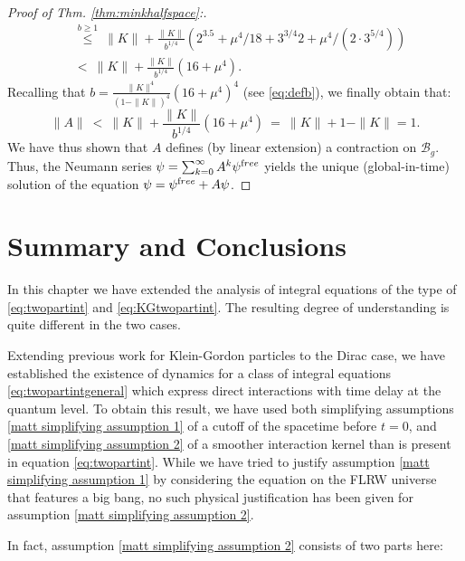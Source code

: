 \documentclass[b5paper,draft,openbib,12pt]{memoir}
\newcommand{\free}{{\textup free}}
\newcommand{\Banach}{\mathscr{B}}
\begin{document}
\begin{proof}[Proof of Thm. \ref{thm:minkhalfspace}:]
\begin{align}
&\overset{b\ge 1}{\le}~ \|K\| + \frac{\|K\|}{b^{1/4}} \left(2^{3.5}+ \mu^4/18 + 3^{3/4} 2 + \mu^4/(2 \cdot 3^{5/4})\right)\\
&<~ \|K\| + \frac{\|K\|}{b^{1/4}} (16 + \mu^4 ).
\end{align}
Recalling that $b=\frac{\|K\|^4}{(1-\|K\|)^4} (16+\mu^4)^4$ (see 
\eqref{eq:defb}), we finally obtain that:
\begin{equation}
	\|A\| ~<~ \|K\| + \frac{\|K\|}{b^{1/4}} (16 + \mu^4 ) ~= ~ \|K\| + 1-\|K\| =1.
\end{equation}
We have thus shown that $A$ defines (by linear extension) a 
contraction on $\Banach_g$. Thus, the Neumann series 
$\psi = \sum_{k=0}^\infty A^k \psi^\free$ yields the unique 
(global-in-time) solution of the equation 
\(\psi=\psi^\free+A\psi\). 
\end{proof}


\section{Summary and Conclusions}
In this chapter we have extended 
the analysis of integral equations 
of the type of \eqref{eq:twopartint} and \eqref{eq:KGtwopartint}.
The resulting degree of understanding is quite different 
in the two cases.

Extending previous work for Klein-Gordon particles 
\cite{mtve,lienertcurved} to the Dirac case, we have established the 
existence of dynamics for a class of integral equations 
\eqref{eq:twopartintgeneral} which express 
direct interactions with time delay at the quantum level. To obtain 
this result, we have used both simplifying assumptions 
\ref{matt simplifying assumption 1} of a cutoff of the spacetime before $t=0$, 
and \ref{matt simplifying assumption 2} of a smoother interaction 
kernel than is present in equation \eqref{eq:twopartint}. While we have tried
to justify assumption \ref{matt simplifying assumption 1}  
by considering the equation on the FLRW universe that features a 
big bang, no such physical justification has been given for 
assumption \ref{matt simplifying assumption 2}.

In fact, assumption \ref{matt simplifying assumption 2} consists 
of two parts here:
\end{document}
